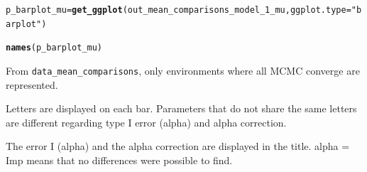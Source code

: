 \documentclass{book}\usepackage[]{graphicx}\usepackage[]{color}
\makeatletter
\newcommand{\hlstr}[1]{\textcolor[rgb]{0.192,0.494,0.8}{#1}}%
\newcommand{\hlstd}[1]{\textcolor[rgb]{0.345,0.345,0.345}{#1}}%
\newcommand{\hlkwb}[1]{\textcolor[rgb]{0.69,0.353,0.396}{#1}}%
\newcommand{\hlkwc}[1]{\textcolor[rgb]{0.333,0.667,0.333}{#1}}%
\newcommand{\hlkwd}[1]{\textcolor[rgb]{0.737,0.353,0.396}{\textbf{#1}}}%
\newenvironment{kframe}{%
 \def\at@end@of@kframe{}%
 \ifinner\ifhmode%
  \def\at@end@of@kframe{\end{minipage}}%
  \begin{minipage}{\columnwidth}%
 \fi\fi%
 \def\FrameCommand##1{\hskip\@totalleftmargin \hskip-\fboxsep
 \colorbox{shadecolor}{##1}\hskip-\fboxsep
     \hskip-\linewidth \hskip-\@totalleftmargin \hskip\columnwidth}%
 \MakeFramed {\advance\hsize-\width
   \@totalleftmargin\z@ \linewidth\hsize
   \@setminipage}}%
 {\par\unskip\endMakeFramed%
 \at@end@of@kframe}
\newenvironment{knitrout}{}{} %
\makeatother
\begin{document}
\begin{knitrout}
\color{fgcolor}\begin{kframe}
\begin{alltt}
\hlstd{p_barplot_mu} \hlkwb{=} \hlkwd{get_ggplot}\hlstd{(out_mean_comparisons_model_1_mu,} \hlkwc{ggplot.type} \hlstd{=} \hlstr{"barplot"}\hlstd{)}
\end{alltt}


{\ttfamily\noindent\bfseries{}}\begin{alltt}
\hlkwd{names}\hlstd{(p_barplot_mu)}
\end{alltt}


{\ttfamily\noindent\bfseries\color{errorcolor}{\#\# Error in eval(expr, envir, enclos): objet 'p\_barplot\_mu' introuvable}}\end{kframe}
\end{knitrout}

From \texttt{data\_mean\_comparisons}, only environments where all MCMC converge are represented.

Letters are displayed on each bar. Parameters that do not share the same letters are different regarding type I error (alpha) and alpha correction. 

The error I (alpha) and the alpha correction are displayed in the title. 
alpha = Imp means that no differences were possible to find.
\end{document}
